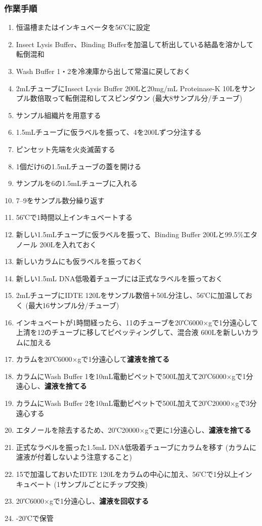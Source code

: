 \documentclass[titlepage,10pt,a4paper,uplatex]{jsbook}
\renewcommand{\textbf}[1]{{\bfseries\sffamily#1}}
\begin{document}
\subsubsection{作業手順}
\begin{enumerate}
\item 恒温槽またはインキュベータを56℃に設定
\item Insect Lysis Buffer、Binding Bufferを加温して析出している結晶を溶かして転倒混和
\item Wash Buffer 1・2を冷凍庫から出して常温に戻しておく
\item 2mLチューブにInsect Lysis Buffer 200{\textmu}Lと20mg/mL Proteinase-K 10{\textmu}Lをサンプル数倍取って転倒混和してスピンダウン (最大8サンプル分/チューブ)
\item サンプル組織片を用意する
\item 1.5mLチューブに仮ラベルを振って、4を200{\textmu}Lずつ分注する
\item ピンセット先端を火炎滅菌する
\item 1個だけ6の1.5mLチューブの蓋を開ける
\item サンプルを6の1.5mLチューブに入れる
\item 7--9をサンプル数分繰り返す
\item 56℃で1時間以上インキュベートする
\item 新しい1.5mLチューブに仮ラベルを振って、Binding Buffer 200{\textmu}Lと99.5\%エタノール 200{\textmu}Lを入れておく
\item 新しいカラムにも仮ラベルを振っておく
\item 新しい1.5mL DNA低吸着チューブには正式なラベルを振っておく
\item 2mLチューブにIDTE 120{\textmu}Lをサンプル数倍＋50{\textmu}L分注し、56℃に加温しておく (最大16サンプル分/チューブ)
\item インキュベートが1時間経ったら、11のチューブを20℃6000×gで1分遠心して上清を12のチューブに移してピペッティングして、混合液 600{\textmu}Lを新しいカラムに加える
\item カラムを20℃6000×gで1分遠心して\textbf{濾液を捨てる}
\item カラムにWash Buffer 1を10mL電動ピペットで500{\textmu}L加えて20℃6000×gで1分遠心し、\textbf{濾液を捨てる}
\item カラムにWash Buffer 2を10mL電動ピペットで500{\textmu}L加えて20℃20000×gで3分遠心する
\item エタノールを除去するため、20℃20000×gで更に1分遠心し、\textbf{濾液を捨てる}
\item 正式なラベルを振った1.5mL DNA低吸着チューブにカラムを移す (カラムに濾液が付着しないよう注意すること)
\item 15で加温しておいたIDTE 120{\textmu}Lをカラムの中心に加え、56℃で1分以上インキュベート (1サンプルごとにチップ交換)
\item 20℃6000×gで1分遠心し、\textbf{濾液を回収する}
\item -20℃で保管
\end{enumerate}
\end{document}
